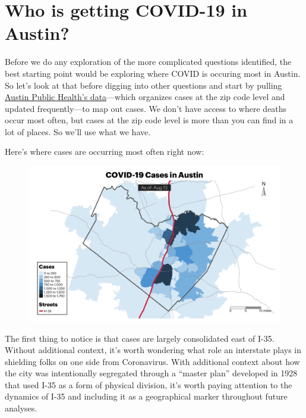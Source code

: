 \documentclass[
]{report}
\begin{document}
\hypertarget{who-is-getting-covid-19-in-austin}{%
\chapter{Who is getting COVID-19 in
Austin?}\label{who-is-getting-covid-19-in-austin}}

Before we do any exploration of the more complicated questions
identified, the best starting point would be exploring where COVID is
occuring most in Austin. So let's look at that before digging into other
questions and start by pulling
\href{https://www.arcgis.com/home/item.html?id=08e581f856cb4ceaa56adf4493d77264\&sublayer=0\&view=list\&sortOrder=true\&sortField=defaultFSOrder\#overview}{Austin
Public Health's data}---which organizes cases at the zip code level and
updated frequently---to map out cases. We don't have access to where
deaths occur most often, but cases at the zip code level is more than
you can find in a lot of places. So we'll use what we have.

Here's where cases are occurring most often right now:

\begin{figure}

{\centering \includegraphics{covid_case_map.png}

}

\end{figure}

The first thing to notice is that cases are largely consolidated east of
I-35. Without additional context, it's worth wondering what role an
interstate plays in shielding folks on one side from Coronavirus. With
additional context about how the city was intentionally segregated
through a ``master plan'' developed in 1928 that used I-35 as a form of
physical division, it's worth paying attention to the dynamics of I-35
and including it as a geographical marker throughout future analyses.
\end{document}
